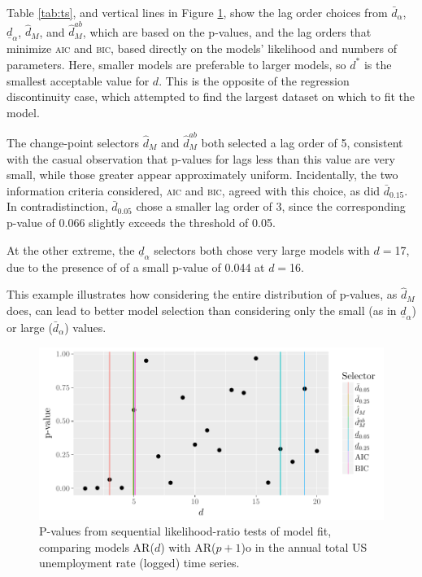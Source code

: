 \documentclass[lineno]{biometrika}\usepackage[]{graphicx}\usepackage[]{color}
\makeatletter
\def\maxwidth{ %
  \ifdim\Gin@nat@width>\linewidth
    \linewidth
  \else
    \Gin@nat@width
  \fi
}
\newcommand{\dalphaU}{\bar{d}_\alpha}
\newcommand{\dalphaB}{\underline{d}_\alpha}
\newcommand{\dstar}{d^*}
\newcommand{\dhatU}{\bar{d}}
\newcommand{\dhatm}{\hat{d}_M}
\newcommand{\dhatmab}{\hat{d}^{ab}_M}
\makeatother
\begin{document}
Table \ref{tab:ts}, and vertical lines in Figure \ref{fig:tspvalues1},
show the lag order choices from $\dalphaU$, $\dalphaB$, $\dhatm$, and
$\dhatmab$, which are based on the p-values, and the lag orders that
minimize \textsc{aic} and \textsc{bic}, based directly on the models' likelihood and numbers
of parameters.
Here, smaller models are preferable to larger models, so $\dstar$ is
the smallest acceptable value for $d$.
This is the opposite of the regression discontinuity case, which attempted to find the
largest dataset on which to fit the model.






The change-point selectors $\dhatm$ and $\dhatmab$ both selected a
lag order of 5, consistent with the casual
observation that p-values for lags less than this value are very
small, while those greater appear approximately uniform.
Incidentally, the two information criteria considered, \textsc{aic} and \textsc{bic},
agreed with this choice, as did $\dhatU_{0.15}$.
In contradistinction, $\dhatU_{0.05}$ chose a smaller lag order of
3, since the corresponding p-value of
0.066 slightly exceeds the threshold of 0.05.

At the other extreme, the $\dalphaB$ selectors both chose very large
models with $d=$17, due to the presence of
of a small p-value of
0.044 at
$d=$16.

This example illustrates how considering the entire distribution of
p-values, as $\dhatm$ does, can lead to better model selection than
considering only the small (as in $\dalphaB$) or large ($\dalphaU$)
values.

\begin{figure}

\includegraphics[width=\maxwidth]{figure/tsResults-1}

\caption{P-values from sequential likelihood-ratio tests of model fit,
  comparing models AR($d$) with AR($p+1$)o in the annual total US
  unemployment rate (logged) time series.}
\label{fig:tspvalues1}
\end{figure}
\end{document}
